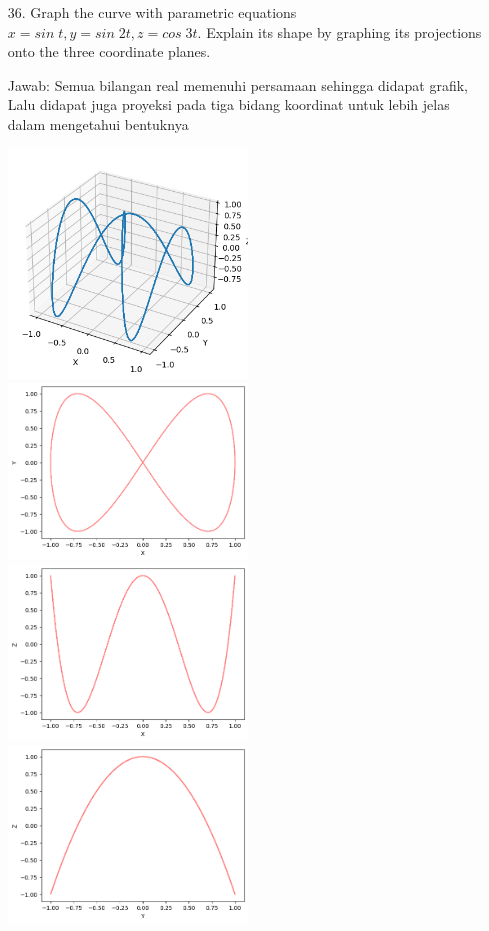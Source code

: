 \documentclass[twoside]{scrarticle}
\begin{document}
\begin{enumerate}
\item[36.] Graph the curve with parametric equations $x = sin\;t, y = sin\;2t, z = cos\;3t$. 
Explain its shape by graphing its projections onto the three coordinate planes.

Jawab: Semua bilangan real memenuhi persamaan sehingga didapat grafik, 
Lalu didapat juga proyeksi pada tiga bidang koordinat untuk lebih jelas dalam
mengetahui bentuknya 

\begin{minipage}{\linewidth}
    \includegraphics[width=0.5\textwidth]{36.png}
    \includegraphics[width=0.5\textwidth]{36_xy.png}
    \includegraphics[width=0.5\textwidth]{36_xz.png}
    \includegraphics[width=0.5\textwidth]{36_yz.png}
\end{minipage}


\end{enumerate}
\end{document}
